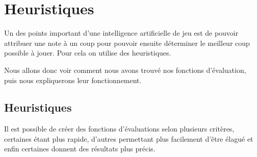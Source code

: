 \chapter{Heuristiques}

	Un des points important d'une intelligence artificielle de jeu est de pouvoir
	attribuer une note à un coup pour pouvoir ensuite déterminer le meilleur
	coup possible à jouer. Pour cela on utilise des heuristiques.

	Nous allons donc voir comment nous avons trouvé nos fonctions d'évaluation,
	puis nous expliquerons leur fonctionnement.



\section{Heuristiques}

	Il est possible de créer des fonctions d'évaluations selon plusieurs
	critères, certaines étant plus rapide, d'autres permettant plus facilement
	d'être élagué et enfin certaines donnent des résultats plus précis.


	
	
	


